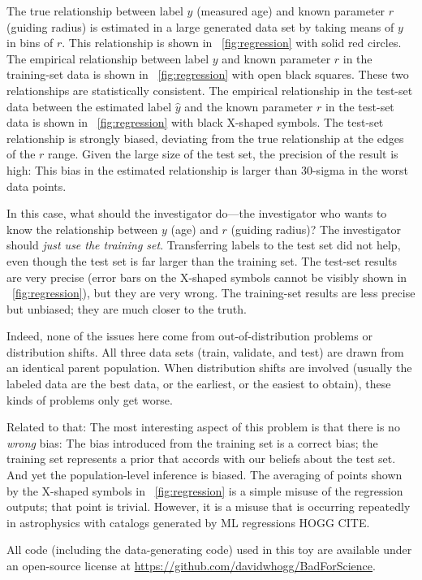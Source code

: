 \documentclass[11pt]{article}
\begin{document}
The true relationship between label $y$ (measured age) and known parameter $r$ (guiding radius) is estimated in a large generated data set by taking means of $y$ in bins of $r$.
This relationship is shown in \figurename~\ref{fig:regression} with solid red circles.
The empirical relationship between label $y$ and known parameter $r$ in the training-set data is shown in \figurename~\ref{fig:regression} with open black squares.
These two relationships are statistically consistent.
The empirical relationship in the test-set data between the estimated label $\hat{y}$ and the known parameter $r$ in the test-set data is shown in \figurename~\ref{fig:regression} with black X-shaped symbols.
The test-set relationship is strongly biased, deviating from the true relationship at the edges of the $r$ range.
Given the large size of the test set, the precision of the result is high: This bias in the estimated relationship is larger than 30-sigma in the worst data points.

In this case, what should the investigator do---the investigator who wants to know the relationship between $y$ (age) and $r$ (guiding radius)?
The investigator should \emph{just use the training set}.
Transferring labels to the test set did not help, even though the test set is far larger than the training set.
The test-set results are very precise (error bars on the X-shaped symbols cannot be visibly shown in \figurename~\ref{fig:regression}), but they are very wrong.
The training-set results are less precise but unbiased; they are much closer to the truth.

Indeed, none of the issues here come from out-of-distribution problems or distribution shifts.
All three data sets (train, validate, and test) are drawn from an identical parent population.
When distribution shifts are involved (usually the labeled data are the best data, or the earliest, or the easiest to obtain), these kinds of problems only get worse.

Related to that: The most interesting aspect of this problem is that there is no \emph{wrong} bias:
The bias introduced from the training set is a correct bias; the training set represents a prior that accords with our beliefs about the test set.
And yet the population-level inference is biased.
The averaging of points shown by the X-shaped symbols in \figurename~\ref{fig:regression} is a simple misuse of the regression outputs; that point is trivial.
However, it is a misuse that is occurring repeatedly in astrophysics with catalogs generated by ML regressions HOGG CITE.

All code (including the data-generating code) used in this toy are available under an open-source license at \url{https://github.com/davidwhogg/BadForScience}.
\end{document}
